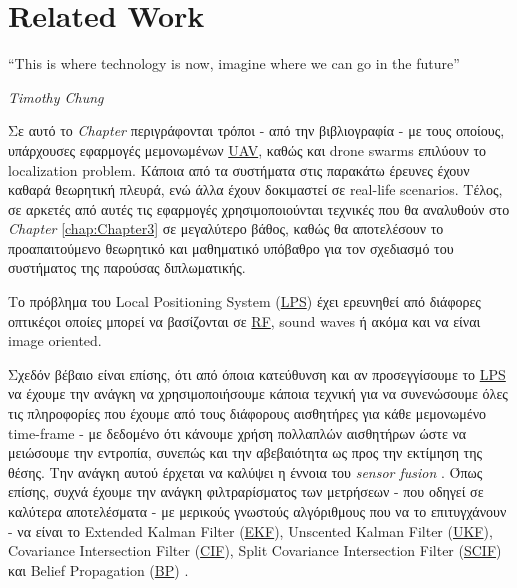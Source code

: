 \chapter{Related Work} \label{chap:Chapter2}       
\epigraph{``This is where technology is now, imagine where we can go in the future” }{\textit{Timothy Chung}}

Σε αυτό το \emph{Chapter} περιγράφονται τρόποι - από την βιβλιογραφία - με τους οποί\-ους, υπάρχουσες εφαρμογές 
μεμονωμένων \hyperref[abbr:UAV]{UAV}, καθώς και drone swarms επιλύουν το localization pro\-blem. Κάποια από τα συστήματα στις παρακάτω έρευνες έχουν καθαρά
θεωρητική πλευρά, ενώ άλλα έχουν δοκιμαστεί σε real-life scenarios.
Τέλος, σε αρκετές από αυτές τις εφαρμογές χρησιμοποιούνται τεχνικές που θα αναλυθούν στο \emph{Chapter} \ref{chap:Chapter3} 
σε μεγαλύτερο βάθος, καθώς θα αποτελέσουν το προαπαιτούμενο θεωρητικό και μαθηματικό υπόβαθρο για τον σχεδιασμό του συστήματος της παρούσας διπλωματικής.


Το πρόβλημα του Local Positioning System 
(\hyperref[abbr:LPS]{LPS}) \cite{lps} έχει ερευνηθεί από διάφορες οπτικές\udot οι οποίες μπορεί να βασίζονται σε 
\hyperref[abbr:RF]{RF}, sound waves ή ακόμα και να είναι image oriented.

Σχεδόν βέβαιο είναι επίσης, ότι από όποια κατεύθυνση και αν προσεγγίσουμε το \hyperref[abbr:LPS]{LPS} να έχουμε την ανάγκη να 
χρησιμοποιήσουμε κάποια τεχνική για να συνενώσουμε όλες τις πληροφορίες που έχουμε από τους διάφορους αισθητήρες για κάθε μεμονωμένο 
time-frame - με δεδομένο ότι κάνουμε χρήση πολλαπλών αισθητήρων ώστε να μειώσουμε την εντροπία, συνεπώς και την αβεβαιότητα ως 
προς την εκτίμηση της θέσης. 
Την ανάγκη αυτού έρχεται να καλύψει η έννοια του \emph{sensor fusion} \cite{sensor-fusion}. Όπως επίσης, συχνά 
έχουμε την ανάγκη φιλτραρίσματος των μετρήσεων - που οδηγεί σε καλύτερα αποτελέσματα - με μερικούς γνωστούς 
αλγόριθμους που να το επιτυγχάνουν - να είναι το  
Extended Kalman Filter (\hyperref[abbr:EKF]{EKF}), Unscented Kalman Filter (\hyperref[abbr:UKF]{UKF}), Covariance Intersection  
Filter (\hyperref[abbr:CIF]{CIF}),  Split  Covariance  Intersection  Filter (\hyperref[abbr:SCIF]{SCIF}) και  Belief  Propagation 
(\hyperref[abbr:BP]{BP}) \cite{fusion-filters}. 

